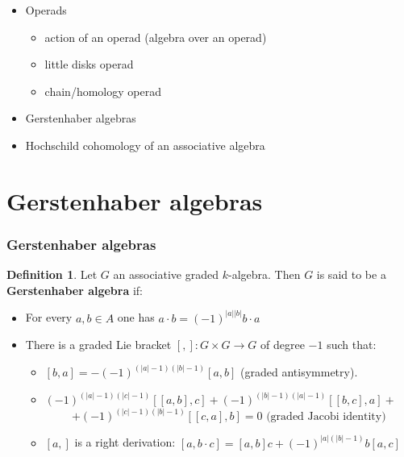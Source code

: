 \documentclass{beamer}
\theoremstyle{definition}
\newtheorem{defi}{Definition}
\begin{document}
\begin{frame}
	\begin{itemize}
		\item Operads \checkmark
		\begin{itemize}
			\item action of an operad (algebra over an operad) \checkmark
			\item little disks operad \checkmark
			\item chain/homology operad	\checkmark		
		\end{itemize}
		\item Gerstenhaber algebras
		\item Hochschild cohomology of an associative algebra
	\end{itemize}
\end{frame}



\section{Gerstenhaber algebras}

\begin{frame}
	\frametitle{Gerstenhaber algebras}
	\begin{defi}
		Let $G$ an associative graded $k$-algebra. Then $G$ is said to be a \textbf{Gerstenhaber algebra} if:
		\begin{itemize}
			\item<2-> For every $a,b\in A$ one has $a\cdot b=(-1)^{|a||b|}b\cdot a$
			\item<3-> There is a graded Lie bracket $[,]:G\times G\to G$ of degree $-1$ such that:
			\begin{itemize}
				\item<4-> $[b,a]=-(-1)^{(|a|-1)(|b|-1)}[a,b]$ (graded antisymmetry).
				\item<5->   $(-1)^{(|a|-1)(|c|-1)}[[a,b],c]+(-1)^{(|b|-1)(|a|-1)}[[b,c],a]+$ $$+(-1)^{(|c|-1)(|b|-1)}[[c,a],b]=0 \text{ (graded Jacobi identity)}$$ 
				\item<6-> $[a,]$ is a right derivation: $[a,b\cdot c] = [a,b]c+(-1)^{|a|(|b|-1)}b[a,c]$ %
			
			\end{itemize}
		\end{itemize}
	\end{defi}
	
\end{frame}
\end{document}
